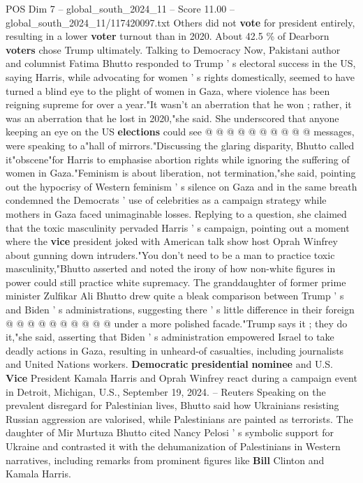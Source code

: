 \begin{textsample}{POS Dim 7 – global\_south\_2024\_11 – Score 11.00 – global\_south\_2024\_11/117420097.txt}
Others did not \textbf{vote} for president entirely, resulting in a lower \textbf{voter} turnout than in 2020.
About 42.5 \% of Dearborn \textbf{voters} chose Trump ultimately.
Talking to Democracy Now, Pakistani author and columnist Fatima Bhutto responded to Trump ' s electoral success in the US, saying Harris, while advocating for women ' s rights domestically, seemed to have turned a blind eye to the plight of women in Gaza, where violence has been reigning supreme for over a year."It wasn't an aberration that he won ; rather, it was an aberration that he lost in 2020,"she said.
She underscored that anyone keeping an eye on the US \textbf{elections} could see @ @ @ @ @ @ @ @ @ @ messages, were speaking to a"hall of mirrors."Discussing the glaring disparity, Bhutto called it"obscene"for Harris to emphasise abortion rights while ignoring the suffering of women in Gaza."Feminism is about liberation, not termination,"she said, pointing out the hypocrisy of Western feminism ' s silence on Gaza and in the same breath condemned the Democrats ' use of celebrities as a campaign strategy while mothers in Gaza faced unimaginable losses.
Replying to a question, she claimed that the toxic masculinity pervaded Harris ' s campaign, pointing out a moment where the \textbf{vice} president joked with American talk show host Oprah Winfrey about gunning down intruders."You don't need to be a man to practice toxic masculinity,"Bhutto asserted and noted the irony of how non-white figures in power could still practice white supremacy.
The granddaughter of former prime minister Zulfikar Ali Bhutto drew quite a bleak comparison between Trump ' s and Biden ' s administrations, suggesting there ' s little difference in their foreign @ @ @ @ @ @ @ @ @ @ under a more polished facade."Trump says it ; they do it,"she said, asserting that Biden ' s administration empowered Israel to take deadly actions in Gaza, resulting in unheard-of casualties, including journalists and United Nations workers. \textbf{Democratic} \textbf{presidential} \textbf{nominee} and U.S. \textbf{Vice} President Kamala Harris and Oprah Winfrey react during a campaign event in Detroit, Michigan, U.S., September 19, 2024. -- Reuters Speaking on the prevalent disregard for Palestinian lives, Bhutto said how Ukrainians resisting Russian aggression are valorised, while Palestinians are painted as terrorists.
The daughter of Mir Murtuza Bhutto cited Nancy Pelosi ' s symbolic support for Ukraine and contrasted it with the dehumanization of Palestinians in Western narratives, including remarks from prominent figures like \textbf{Bill} Clinton and Kamala Harris.

\end{textsample}
